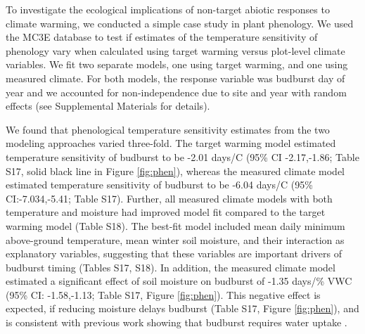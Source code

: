 \documentclass{article}
\begin{document}
\par To investigate the ecological implications of non-target abiotic responses to climate warming, we conducted a simple case study in plant phenology. We used the MC3E database to test if estimates of the temperature sensitivity of phenology vary when calculated using target warming versus plot-level climate variables. We fit two separate models, one using target warming, and one using measured climate. For both models, the response variable was budburst day of year and we accounted for non-independence due to site and year with random effects (see Supplemental Materials for details).%

\par We found that phenological temperature sensitivity estimates from the two modeling approaches varied three-fold. The target warming model estimated temperature sensitivity of budburst to be -2.01 days/\degree C (95\% CI -2.17,-1.86; Table S17, solid black line in Figure \ref{fig:phen}), whereas the measured climate model estimated temperature sensitivity of budburst to be -6.04 days/\degree C (95\% CI:-7.034,-5.41; Table S17). Further, all measured climate models with both temperature and moisture had improved model fit compared to the target warming model (Table S18). The best-fit model included mean daily minimum above-ground temperature, mean winter soil moisture, and their interaction as explanatory variables, suggesting that these variables are important drivers of budburst timing (Tables S17, S18). 
In addition, the measured climate model estimated a significant effect of soil moisture on budburst of -1.35 days/\% VWC (95\% CI: -1.58,-1.13; Table S17, Figure \ref{fig:phen}). This negative effect is expected, if reducing moisture delays budburst (Table S17, Figure \ref{fig:phen}), and is consistent with previous work showing that budburst requires water uptake \citep{essiamah1986}. 
\end{document}
